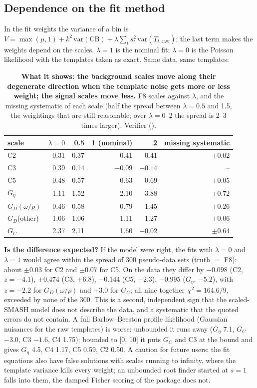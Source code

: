 \documentclass[11pt,a4paper]{article}
\newcommand{\code}[1]{\texttt{\detokenize{#1}}}
\newcommand{\Geta}{\ensuremath{G_\eta}\xspace}
\begin{document}
\subsection{Dependence on the fit method}
\label{sec:flex-method}
In the fit weights the variance of a bin is $V=\max(\mu,1)+k^2\,\mathrm{var}(\mathrm{CB})+\lambda\sum_t s_t^2\,\mathrm{var}(T_{t,\mathrm{raw}})$; the last
term makes the weights depend on the scales. $\lambda=1$ is the nominal fit; $\lambda=0$ is the Poisson likelihood with the templates taken as
exact. Same data, same templates:

\begin{table}[H]
\centering
\caption{\textbf{What it shows: the background scales move along their degenerate direction when the template noise gets more or less weight; the
signal scales move less.} F8 scales against $\lambda$, and the missing systematic of each scale (half the spread between $\lambda=0.5$ and 1.5, the
weightings that are still reasonable; over $\lambda=0$--2 the spread is 2--3 times larger). Verifier (\code{vflex_lamscan.json}).}
\label{tab:flex-lambda}
\footnotesize
\begin{tabular}{@{}l r r r r r@{}}
\toprule
scale & $\lambda=0$ & 0.5 & 1 (nominal) & 2 & missing systematic \\
\midrule
C2 & 0.31 & 0.37 & 0.41 & 0.41 & $\pm0.02$ \\
C3 & 0.39 & 0.14 & $-0.09$ & $-0.14$ & -- \\
C5 & 0.48 & 0.57 & 0.63 & 0.69 & $\pm0.05$ \\
\Geta & 1.11 & 1.52 & 2.10 & 3.88 & $\pm0.72$ \\
$G_D(\omega/\rho)$ & 0.46 & 0.58 & 0.79 & 1.45 & $\pm0.26$ \\
$G_D$(other) & 1.06 & 1.06 & 1.11 & 1.27 & $\pm0.06$ \\
$G_C$ & 2.37 & 2.11 & 1.60 & $-0.02$ & $\pm0.64$ \\
\bottomrule
\end{tabular}
\end{table}

\textbf{Is the difference expected?} If the model were right, the fits with $\lambda=0$ and $\lambda=1$ would agree within the spread of 300 pseudo-data
sets (truth $=$ F8): about $\pm0.03$ for C2 and $\pm0.07$ for C5. On the data they differ by $-0.098$ (C2, $z=-4.1$), $+0.474$ (C3, $+6.8$), $-0.144$ (C5,
$-2.3$), $-0.995$ (\Geta, $-5.2$), with $z=-2.2$ for $G_D(\omega/\rho)$ and $+3.0$ for $G_C$; all nine together $\chi^2=164.6/9$, exceeded by none of the
300. This is a second, independent sign that the scaled-SMASH model does not describe the data, and a systematic that the quoted errors do not
contain. A full Barlow--Beeston profile likelihood (Gaussian nuisances for the raw templates) is worse: unbounded it runs away (\Geta 7.1, $G_C$
$-3.0$, C3 $-1.6$, C4 1.75); bounded to [0, 10] it puts $G_C$ and C3 at the bound and gives \Geta 4.5, C4 1.17, C5 0.59, C2 0.50. A caution for
future users: the fit equations also have false solutions with scales running to infinity, where the template variance kills every weight; an
unbounded root finder started at $s=1$ falls into them, the damped Fisher scoring of the package does not.
\end{document}
